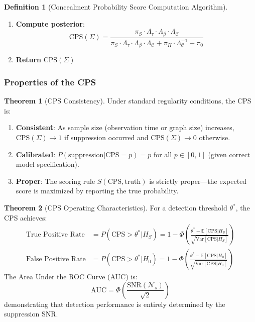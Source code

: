\documentclass[12pt,a4paper]{article}
\theoremstyle{definition}
\newtheorem{definition}{Definition}[section]
\newtheorem{theorem}{Theorem}[section]
\theoremstyle{remark}
\newcommand{\NS}{\mathcal{N}_s}          %
\begin{document}
\begin{definition}[Concealment Probability Score Computation Algorithm]
\begin{enumerate}
    \item \textbf{Compute posterior}:
    \begin{equation}
        \text{CPS}(\Sigma) = \frac{\pi_S \cdot \Lambda_\tau \cdot \Lambda_\beta \cdot \Lambda_{\mathcal{C}}}{\pi_S \cdot \Lambda_\tau \cdot \Lambda_\beta \cdot \Lambda_{\mathcal{C}} + \pi_H \cdot \Lambda_{\mathcal{C}}^{-1} + \pi_0}
    \end{equation}
    
    \item \textbf{Return} $\text{CPS}(\Sigma)$
\end{enumerate}
\end{definition}

\subsubsection{Properties of the CPS}

\begin{theorem}[CPS Consistency]
\label{thm:cps-consistency}
Under standard regularity conditions, the CPS is:
\begin{enumerate}
    \item \textbf{Consistent}: As sample size (observation time or graph size) increases, $\text{CPS}(\Sigma) \to 1$ if suppression occurred and $\text{CPS}(\Sigma) \to 0$ otherwise.
    
    \item \textbf{Calibrated}: $P(\text{suppression} | \text{CPS} = p) = p$ for all $p \in [0,1]$ (given correct model specification).
    
    \item \textbf{Proper}: The scoring rule $S(\text{CPS}, \text{truth})$ is strictly proper—the expected score is maximized by reporting the true probability.
\end{enumerate}
\end{theorem}

\begin{theorem}[CPS Operating Characteristics]
\label{thm:roc}
For a detection threshold $\theta^*$, the CPS achieves:
\begin{align}
    \text{True Positive Rate} &= P(\text{CPS} > \theta^* | H_S) = 1 - \Phi\left( \frac{\theta^* - \mathbb{E}[\text{CPS}|H_S]}{\sqrt{\text{Var}[\text{CPS}|H_S]}} \right) \\
    \text{False Positive Rate} &= P(\text{CPS} > \theta^* | H_0) = 1 - \Phi\left( \frac{\theta^* - \mathbb{E}[\text{CPS}|H_0]}{\sqrt{\text{Var}[\text{CPS}|H_0]}} \right)
\end{align}
The Area Under the ROC Curve (AUC) is:
\begin{equation}
    \text{AUC} = \Phi\left( \frac{\text{SNR}(\NS)}{\sqrt{2}} \right)
\end{equation}
demonstrating that detection performance is entirely determined by the suppression SNR.
\end{theorem}
\end{document}
